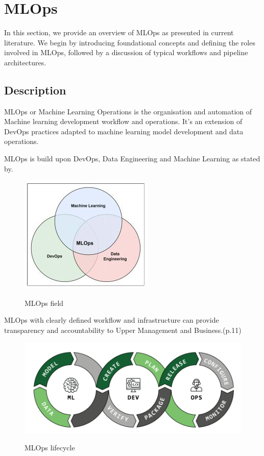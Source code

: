\section{MLOps}\label{sec:mlops}

In this section, we provide an overview of MLOps as presented in current literature.
We begin by introducing foundational concepts and defining the roles involved in MLOps,
followed by a discussion of typical workflows and pipeline architectures.

\subsection{Description}\label{subsec:description}
MLOps or Machine Learning Operations is the organisation and automation of Machine learning development workflow and operations.
It's an extension of DevOps practices adapted to machine learning model development and data operations\cite{Kreuzberger2022MachineLO}.

MLOps is build upon DevOps, Data Engineering and Machine Learning as stated by\cite{9792270}.

\begin{figure}[!htbp]
    \caption{MLOps field\cite{9792270}}
    \centering
    \includegraphics[scale=0.5]{images/ml-dev-data-ops}
    \label{fig:ml-dev-data-ops}
\end{figure}


MLOps with clearly defined workflow and infrastructure can provide transparency and accountability to Upper Management and Business.\cite{treveil2020introducing}(p.11)

\begin{figure}[!htbp]
    \caption{MLOps lifecycle\cite{mlops-definition-tools-and-challenge}}
    \centering
    \includegraphics[scale=0.5]{images/ml-dev-ops}
    \label{fig:ml-dev-ops}
\end{figure}

